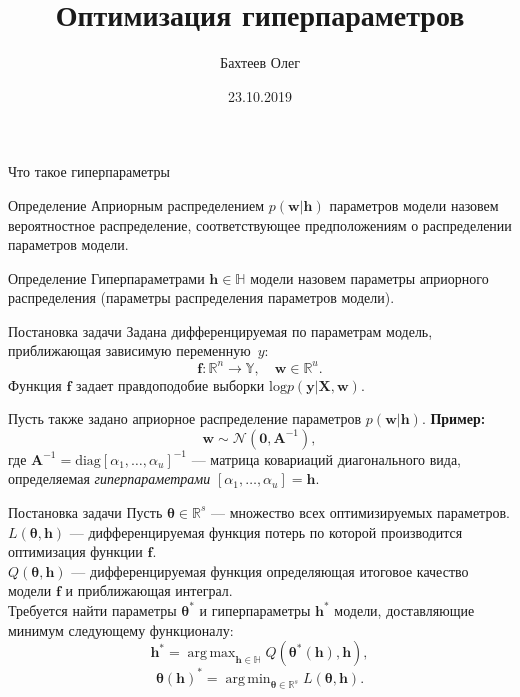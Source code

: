 \documentclass[10pt,pdf,utf8,russian,aspectratio=169]{beamer}
\title[Оптимизация гиперпараметров]{Оптимизация гиперпараметров}
\author{Бахтеев Олег}
\institute{МФТИ}
\date{23.10.2019}
\DeclareMathOperator*{\argmin}{arg\,min}
\DeclareMathOperator*{\argmax}{arg\,max}
\begin{document}
\begin{frame}
  \titlepage
\end{frame}

\begin{frame}{Что такое гиперпараметры}
\begin{block}{Определение}
Априорным распределением $p(\mathbf{w}|\mathbf{h})$ параметров модели назовем вероятностное распределение, соответствующее предположениям о
распределении параметров модели.
\end{block}

\begin{block}{Определение}
Гиперпараметрами $\mathbf{h} \in \mathbb{H}$ модели назовем параметры априорного распределения (параметры распределения параметров модели).
\end{block}

\end{frame}

\begin{frame}{Постановка задачи}
Задана дифференцируемая по параметрам модель, приближающая зависимую переменную~$y$:
\[
	\mathbf{f}:\mathbb{R}^n \to \mathbb{Y}, \quad \mathbf{w} \in \mathbb{R}^u.
\]
Функция $\mathbf{f}$ задает правдоподобие выборки $\text{log}p(\mathbf{y}|\mathbf{X}, \mathbf{w})$. 

Пусть также задано априорное распределение параметров $p(\mathbf{w}|\mathbf{h})$.
\vspace{1cm}
\textbf{Пример:}
 $$\mathbf{w} \sim \mathcal{N}(\mathbf{0}, \mathbf{A}^{-1}),$$
где $\mathbf{A}^{-1} = \text{diag}[\alpha_1, \dots, \alpha_u]^{-1}$ --- матрица ковариаций диагонального вида, определяемая \textit{гиперпараметрами} $[\alpha_1, \dots, \alpha_u] = \mathbf{h}$. 
\end{frame}

\begin{frame}{Постановка задачи}
Пусть $\boldsymbol{\theta} \in \mathbb{R}^s$ --- множество всех оптимизируемых параметров.\\
$L(\boldsymbol{\theta},\mathbf{h})$ ---  дифференцируемая функция потерь  по которой производится оптимизация функции $\mathbf{f}$. \\
$Q(\boldsymbol{\theta},\mathbf{h})$ ---  дифференцируемая функция определяющая итоговое качество модели $\mathbf{f}$ и приближающая интеграл.\\

Требуется найти параметры ${\boldsymbol{\theta}}^{*}$ и гиперпараметры ${\mathbf{h}}^{*}$ модели, доставляющие минимум следующему функционалу:
\[
{\mathbf{h}}^{*} = \argmax_{\mathbf{h} \in \mathbb{H}} Q({\boldsymbol{\theta}^{*}}(\mathbf{h}), \mathbf{h}),
\]
\[
	{\boldsymbol{\theta}}(\mathbf{h})^{*} =  \argmin_{\boldsymbol{\theta} \in \mathbb{R}^s} L(\boldsymbol{\theta}, \mathbf{h}).
\]
\end{frame}
\end{document}

